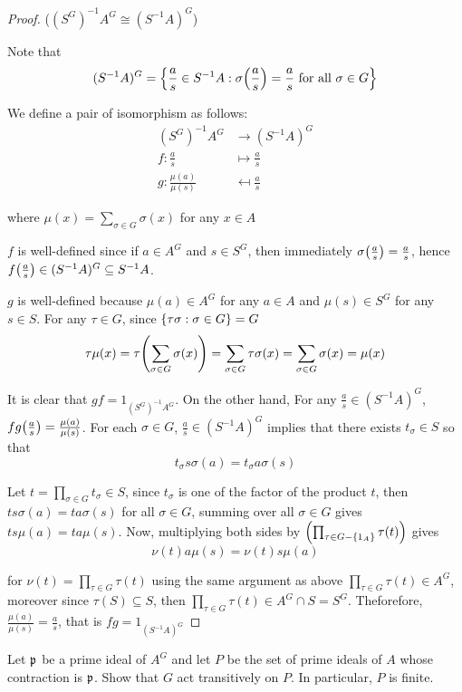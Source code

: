 \begin{proof}
	($(S^G)^{-1} A^G \cong (S^{-1} A)^G$)
	
	Note that
	$$
		(S^{-1} A)^G = \set*{\frac{a}{s} \in S^{-1} A: \sigma\tuple*{\frac{a}{s}} = \frac{a}{s} \text{ for all } \sigma \in G}
	$$
	
	We define a pair of isomorphism as follows: 
	\begin{align*}
		(S^G)^{-1} A^G &\to (S^{-1} A)^G \\
			f: \frac{a}{s} &\mapsto \frac{a}{s} \\
			g: \frac{\mu(a)}{\mu(s)} &\mapsfrom \frac{a}{s}
	\end{align*}
	
	where $\mu(x) = \sum_{\sigma \in G} \sigma(x)$ for any $x \in A$
	
	$f$ is well-defined since if $a \in A^G$ and $s \in S^G$, then immediately $\sigma\tuple*{\frac{a}{s}} = \frac{a}{s}$, hence $f\tuple*{\frac{a}{s}} \in (S^{-1} A)^G \subseteq S^{-1} A$.
	
	$g$ is well-defined because $\mu(a) \in A^G$ for any $a \in A$ and $\mu(s) \in S^G$ for any $s \in S$. For any $\tau \in G$, since $\set{\tau \sigma: \sigma \in G} = G$
	$$
		\tau \mu (x) = \tau \tuple*{\sum_{\sigma \in G} \sigma(x)} = \sum_{\sigma \in G} \tau \sigma(x) = \sum_{\sigma \in G} \sigma(x) = \mu(x)
	$$
	
	It is clear that $gf = 1_{(S^G)^{-1} A^G}$. On the other hand, For any $\frac{a}{s} \in (S^{-1} A)^G$, $fg\tuple*{\frac{a}{s}} = \frac{\mu(a)}{\mu(s)}$. For each $\sigma \in G$, $\frac{a}{s} \in (S^{-1} A)^G$ implies that there exists $t_\sigma \in S$ so that
	$$
		t_\sigma s \sigma(a) = t_\sigma a \sigma(s)
	$$
	
	Let $t = \prod_{\sigma \in G} t_\sigma \in S$, since $t_\sigma$  is one of the factor of the product $t$, then $t s \sigma(a) = t a \sigma(s)$ for all $\sigma \in G$, summing over all $\sigma \in G$ gives $t s \mu(a) = t a \mu(s)$. Now, multiplying both sides by $\tuple*{\prod_{\tau \in G - \set{1_A}} \tau(t)}$ gives
	$$
		\nu(t) a \mu(s) = \nu(t) s \mu(a)
	$$
	
	for $\nu(t) = \prod_{\tau \in G} \tau(t)$
	using the same argument as above $\prod_{\tau \in G} \tau(t) \in A^G$, moreover since $\tau(S) \subseteq S$, then $\prod_{\tau \in G} \tau(t) \in A^G \cap S = S^G$. Theforefore, $\frac{\mu(a)}{\mu(s)} = \frac{a}{s}$, that is $fg = 1_{(S^{-1} A)^G}$
\end{proof} 

\begin{problem}
	Let $\mf{p}$ be a prime ideal of $A^G$ and let $P$ be the set of prime ideals of $A$ whose contraction is $\mf{p}$. Show that $G$ act transitively on $P$. In particular, $P$ is finite.
\end{problem}

